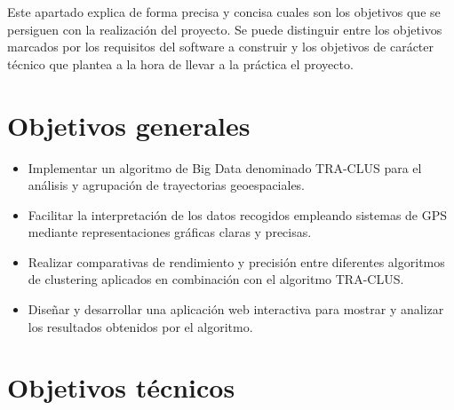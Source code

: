 
Este apartado explica de forma precisa y concisa cuales son los objetivos que se persiguen con la realización del proyecto. Se puede distinguir entre los objetivos marcados por los requisitos del software a construir y los objetivos de carácter técnico que plantea a la hora de llevar a la práctica el proyecto.

\section{Objetivos generales}\label{objetivos-generales}

\begin{itemize}
    \item Implementar un algoritmo de Big Data denominado TRA-CLUS para el análisis y agrupación de trayectorias geoespaciales.
    \item Facilitar la interpretación de los datos recogidos empleando sistemas de GPS mediante representaciones gráficas claras y precisas.
    \item Realizar comparativas de rendimiento y precisión entre diferentes algoritmos de clustering aplicados en combinación con el algoritmo TRA-CLUS.
    \item Diseñar y desarrollar una aplicación web interactiva para mostrar y analizar los resultados obtenidos por el algoritmo.
\end{itemize}

\section{Objetivos técnicos}\label{objetivos-tecnicos}

